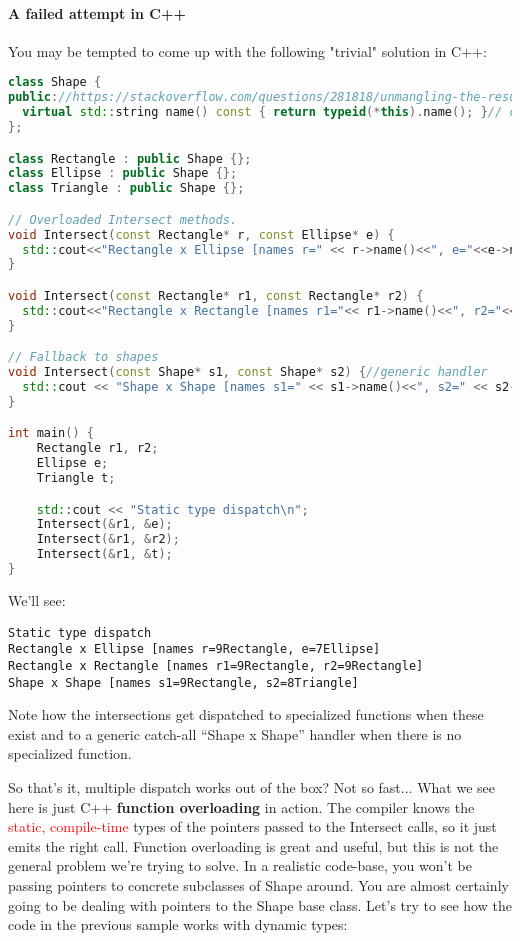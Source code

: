 \documentclass{book}
\begin{document}
\paragraph{A failed attempt in C++}\mbox{}

You may be tempted to come up with the following "trivial" solution in C++:

\begin{lstlisting}[caption={function overloading}, language=C++]
class Shape {
public://https://stackoverflow.com/questions/281818/unmangling-the-result-of-stdtype-infoname
  virtual std::string name() const { return typeid(*this).name(); }// check above link 
};

class Rectangle : public Shape {};
class Ellipse : public Shape {};
class Triangle : public Shape {};

// Overloaded Intersect methods.
void Intersect(const Rectangle* r, const Ellipse* e) {
  std::cout<<"Rectangle x Ellipse [names r=" << r->name()<<", e="<<e->name()<<"]\n";
}

void Intersect(const Rectangle* r1, const Rectangle* r2) {
  std::cout<<"Rectangle x Rectangle [names r1="<< r1->name()<<", r2="<< r2->name()<<"]\n";
}

// Fallback to shapes
void Intersect(const Shape* s1, const Shape* s2) {//generic handler 
  std::cout << "Shape x Shape [names s1=" << s1->name()<<", s2=" << s2->name() << "]\n";
}

int main() {
    Rectangle r1, r2;
    Ellipse e;
    Triangle t;

    std::cout << "Static type dispatch\n";
    Intersect(&r1, &e);
    Intersect(&r1, &r2);
    Intersect(&r1, &t);
}
\end{lstlisting}
We'll see:
\begin{verbatim}
Static type dispatch
Rectangle x Ellipse [names r=9Rectangle, e=7Ellipse]
Rectangle x Rectangle [names r1=9Rectangle, r2=9Rectangle]
Shape x Shape [names s1=9Rectangle, s2=8Triangle]
\end{verbatim}

Note how the intersections get dispatched to specialized functions when these exist and to a generic catch-all ``Shape x Shape'' handler when there is no specialized function.

So that's it, multiple dispatch works out of the box? Not so fast... What we see here is just C++ \textbf{function overloading} in action.
The compiler knows the \textcolor{red}{static, compile-time} types of the pointers passed to the Intersect calls, so it just emits the right call.
Function overloading is great and useful, but this is not the general problem we're trying to solve.
In a realistic code-base, you won't be passing pointers to concrete subclasses of Shape around.
You are almost certainly going to be dealing with pointers to the Shape base class. Let's try to see how the code in the previous sample works with dynamic types:
\end{document}
